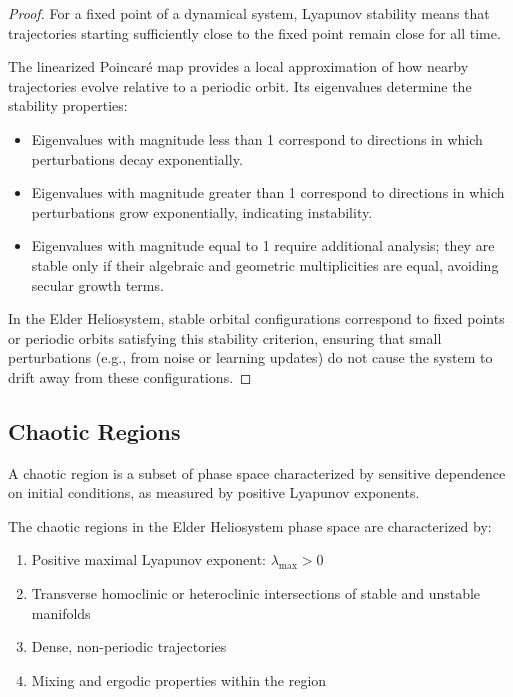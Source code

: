 \begin{proof}
For a fixed point of a dynamical system, Lyapunov stability means that trajectories starting sufficiently close to the fixed point remain close for all time.

The linearized Poincaré map provides a local approximation of how nearby trajectories evolve relative to a periodic orbit. Its eigenvalues determine the stability properties:
\begin{itemize}
    \item Eigenvalues with magnitude less than 1 correspond to directions in which perturbations decay exponentially.
    \item Eigenvalues with magnitude greater than 1 correspond to directions in which perturbations grow exponentially, indicating instability.
    \item Eigenvalues with magnitude equal to 1 require additional analysis; they are stable only if their algebraic and geometric multiplicities are equal, avoiding secular growth terms.
\end{itemize}

In the Elder Heliosystem, stable orbital configurations correspond to fixed points or periodic orbits satisfying this stability criterion, ensuring that small perturbations (e.g., from noise or learning updates) do not cause the system to drift away from these configurations.
\end{proof}

\subsection{Chaotic Regions}

\begin{definition}
A chaotic region is a subset of phase space characterized by sensitive dependence on initial conditions, as measured by positive Lyapunov exponents.
\end{definition}

\begin{theorem}
The chaotic regions in the Elder Heliosystem phase space are characterized by:
\begin{enumerate}
    \item Positive maximal Lyapunov exponent: $\lambda_{\max} > 0$
    \item Transverse homoclinic or heteroclinic intersections of stable and unstable manifolds
    \item Dense, non-periodic trajectories
    \item Mixing and ergodic properties within the region
\end{enumerate}
\end{theorem}

